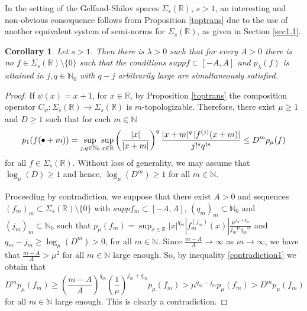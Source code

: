 \documentclass[12pt,reqno]{amsart} %
\newtheorem{corollary}[theorem]{Corollary}
\numberwithin{equation}{section}
\begin{document}
				
			
				In the setting of the Gelfand-Shilov spaces $\Sigma_s(\mathbb{R})$, $s>1$,   an interesting and non-obvious consequence follows from  Proposition \ref{toptrans} due to the  use of another equivalent system of semi-norms for $\Sigma_s(\mathbb{R})$, as given in Section \ref{sec1.1}.
			
				
				\begin{corollary}
					Let $s>1$. Then there is $\lambda>0$ such that for every $A>0$ there is no $f\in \Sigma_s(\mathbb{R})\setminus\{0\}$   such that the conditions  $supp f\subset [-A,A]$ and  $p_{\lambda}(f)$ is attained in $j,q\in\mathbb{N}_0$ with $q-j$  arbitrarily large are simultaneously satisfied.  
				\end{corollary}
				\begin{proof}
					If $\psi(x)=x+1$, for $x\in\mathbb{R}$, by Proposition \ref{toptrans} the composition operator $C_\psi\colon \Sigma_s(\mathbb{R})\to \Sigma_s(\mathbb{R})$ is $m$-topologizable. Therefore,  there  exist $\mu\geq 1$ and $D\geq 1$  such that for each $m\in \mathbb{N}$ 
					\begin{equation}\label{contradiction1}
						p_{1}(f(\bullet+m))= \sup_{j,q\in\mathbb{N}_0}\sup_{x\in\mathbb{R}} \left(\frac{|x|}{|x+m|}\right)^q\frac{|x+m|^q \hspace{0.05cm}|f^{(j)}(x+m)|}{j!^s q!^s}
						\leq D^m p_{\mu}(f)
					\end{equation} 
					for all $f\in \Sigma_s(\mathbb{R})$. Without loss of generality, we may assume that $\log_{\mu}(D)\geq 1$ and hence,  $\log_{\mu}(D^m)\geq 1$ for all $m\in\mathbb{N}$.
					
					Proceeding by contradiction, we suppose that there exist $A>0$ and sequences $(f_m)_m \subset  \Sigma_s(\mathbb{R})\setminus\{0\}$ with $supp f_m\subset [-A,A]$, $(q_m)_m\subset \mathbb{N}_0$ and $(j_m)_m\subset \mathbb{N}_0$ such that $p_\mu(f_m)= \sup_{x\in\mathbb{R}}|x|^{q_m} |f_m^{(j_m)}(x)| \frac{\mu^{j_m+q_m}}{j_m!^s q_m!^s}$ and $q_m-j_m\geq \log_\mu(D^m)>0$, for all $m\in\mathbb{N}$. Since $\frac{m-A}{A}\to\infty$ as $m\to\infty$, we have  that $\frac{m-A}{A}>\mu^2$ for all $m\in\mathbb{N}$ large enough. So, by inequality \eqref{contradiction1} we obtain that \begin{equation*}
							D^m p_\mu(f_m) \geq \left(\frac{m-A}{A}\right)^{q_m} \left(\frac{1}{\mu}\right)^{j_m+q_m} p_{\mu}(f_m) > \mu^{ q_m-j_m}p_{\mu}(f_m)> D^m p_{\mu}(f_m)
					\end{equation*} 
					for all $m\in\mathbb{N}$ large enough. This  is clearly a contradiction.
				\end{proof}
				
\end{document}

